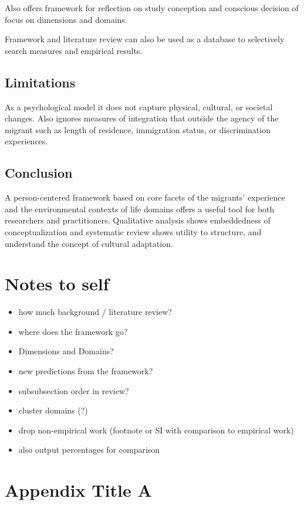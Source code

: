 \documentclass[man, 12pt, a4paper]{apa7}
\begin{document}
Also offers framework for reflection on study conception and conscious decision of focus on dimensions and domains.

Framework and literature review can also be used as a database to selectively search measures and empirical results.
\subsection{Limitations}
As a psychological model it does not capture physical, cultural, or societal changes. Also ignores measures of integration that outside the agency of the migrant such as length of residence, immigration status, or discrimination experiences.

\subsection{Conclusion}
A person-centered framework based on core facets of the migrants’ experience and the environmental contexts of life domains offers a useful tool for both researchers and practitioners. Qualitative analysis shows embeddedness of conceptualization and systematic review shows utility to structure, and understand the concept of cultural adaptation.

\section{Notes to self}
\begin{itemize}
  \item how much background / literature review?
  \item where does the framework go?
  \item Dimensions and Domains?
  \item new predictions from the framework?
  \item subsubsection order in review?
  \item cluster domains (?)
  \item drop non-empirical work (footnote or SI with comparison to empirical work)
  \item also output percentages for comparison
\end{itemize}

\printbibliography

\appendix

\section{Appendix Title A}
\label{app:AppendixLableA}
\end{document}
